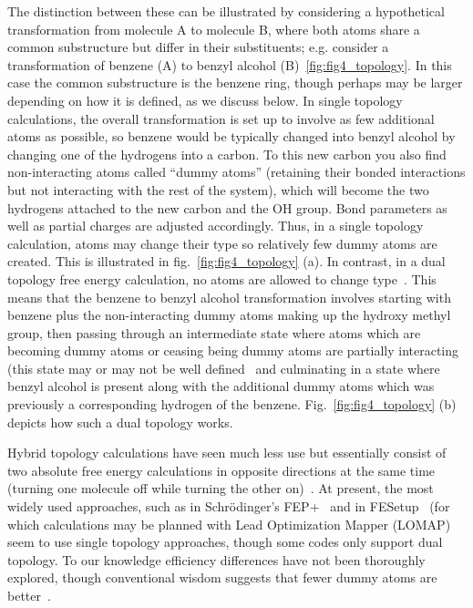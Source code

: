 \documentclass[9pt,bestpractices]{livecoms}
\begin{document}
The distinction between these can be illustrated by considering a hypothetical transformation from molecule A to molecule B, where both atoms share a common substructure but differ in their substituents; e.g. consider a transformation of benzene (A) to benzyl alcohol (B)~\ref{fig:fig4_topology}.
In this case the common substructure is the benzene ring, though perhaps may be larger depending on how it is defined, as we discuss below.
In single topology calculations, the overall transformation is set up to involve as few additional atoms as possible, so benzene would be typically changed into benzyl alcohol by changing one of the hydrogens into a carbon. To this new carbon you also find non-interacting atoms called ``dummy atoms'' (retaining their bonded interactions but not interacting with the rest of the system), which will become the two hydrogens attached to the new carbon and the OH group. Bond parameters as well as partial charges are adjusted accordingly. 
Thus, in a single topology calculation, atoms may change their type so relatively few dummy atoms are created. This is illustrated in fig.~\ref{fig:fig4_topology} (a). 
In contrast, in a dual topology free energy calculation, no atoms are allowed to change type~\cite{shirts2012best}. This means that the benzene to benzyl alcohol transformation involves starting with benzene plus the non-interacting dummy atoms making up the hydroxy methyl group, then passing through an intermediate state where atoms which are becoming dummy atoms or ceasing being dummy atoms are partially interacting (this state may or may not be well defined~\cite{mobley2014blind}  and culminating in a state where benzyl alcohol is present along with the additional dummy atoms which was previously a corresponding hydrogen of the benzene. Fig.~\ref{fig:fig4_topology} (b) depicts how such a dual topology works. 

Hybrid topology calculations have seen much less use but essentially consist of two absolute free energy calculations in opposite directions at the same time (turning one molecule off while turning the other on)~\cite{jiang2019computing}.
At present, the most widely used approaches, such as in Schr\"{o}dinger's FEP+~\cite{wang2019protein} and in FESetup~\cite{loeffler2015fesetup} (for which calculations may be planned with Lead Optimization Mapper (LOMAP)~\cite{liu2013lead} seem to use single topology approaches, though some codes only support dual topology.
To our knowledge efficiency differences have not been thoroughly explored, though conventional wisdom suggests that fewer dummy atoms are better~\cite{liu2013lead,mobley2012perspective}.
\end{document}
